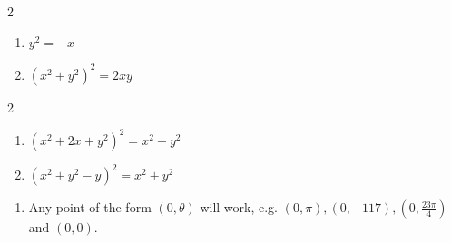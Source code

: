 \documentclass{ximera}
\begin{document}
\begin{multicols}{2}

\begin{enumerate}

\setcounter{enumi}{\value{HW}}

\item  $y^2=-x$
\item  $\left( x^{2} + y^{2} \right)^{2} = 2xy$

\setcounter{HW}{\value{enumi}}

\end{enumerate}

\end{multicols}

\begin{multicols}{2}

\begin{enumerate}

\setcounter{enumi}{\value{HW}}

\item  $\left( x^{2} + 2x + y^{2} \right)^{2} = x^{2} + y^{2}$
\item  $\left( x^{2} + y^{2} - y\right)^{2} = x^{2} + y^{2}$

\setcounter{HW}{\value{enumi}}

\end{enumerate}

\end{multicols}

\begin{enumerate}

\setcounter{enumi}{\value{HW}}

\item Any point of the form $(0, \theta)$ will work, e.g. $(0, \pi), (0, -117), \left( 0, \frac{23\pi}{4} \right) $ and $(0, 0).$

\end{enumerate}
\end{document}
